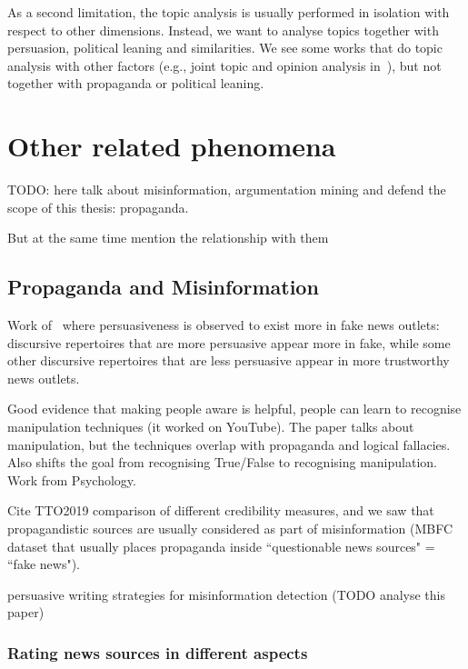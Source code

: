 As a second limitation, the topic analysis is usually performed in isolation with respect to other dimensions.
Instead, we want to analyse topics together with persuasion, political leaning and similarities.
We see some works that do topic analysis with other factors (e.g., joint topic and opinion analysis in~\cite{stoyanov2008topic}), but not together with propaganda or political leaning.

\section{\statusred Other related phenomena}
\label{sec:lit_related}

TODO: here talk about misinformation, argumentation mining and defend the scope of this thesis: propaganda.

But at the same time mention the relationship with them

\subsection{Propaganda and Misinformation}
\label{sec:lit_related_misinformation}

Work of~\citet{orrumachine} where persuasiveness is observed to exist more in fake news outlets: discursive repertoires that are more persuasive appear more in fake, while some other discursive repertoires that are less persuasive appear in more trustworthy news outlets.




\cite{roozenbeek2022countering} Good evidence that making people aware is helpful, people can learn to recognise manipulation techniques (it worked on YouTube). The paper talks about manipulation, but the techniques overlap with propaganda and logical fallacies. Also shifts the goal from recognising True/False to recognising manipulation. Work from Psychology.

Cite TTO2019 comparison of different credibility measures, and we saw that propagandistic sources are usually considered as part of misinformation (MBFC dataset that usually places propaganda inside ``questionable news sources" = ``fake news").


\cite{romain2022misinformation} persuasive writing strategies for misinformation detection (TODO analyse this paper)

\subsubsection{Rating news sources in different aspects}

